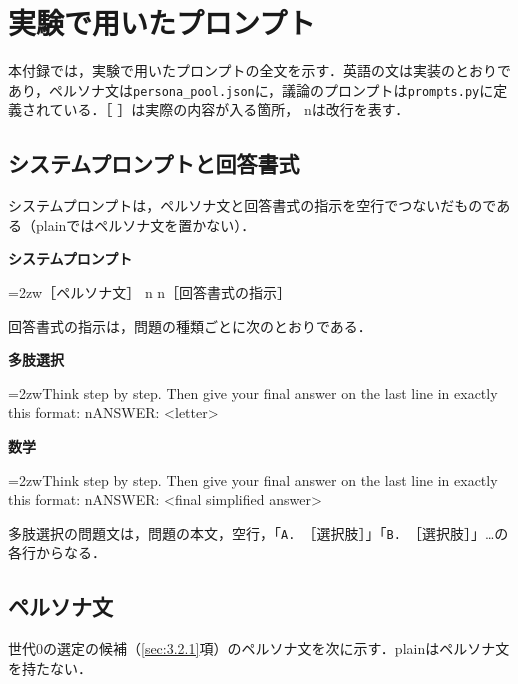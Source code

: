

\chapter{実験で用いたプロンプト}
\label{app:prompts}

\newcommand{\nl}{{\ttfamily\char92 n}}
\newcommand{\prompt}[2]{\par\noindent\textbf{#1}\par
  {\small\ttfamily\raggedright\leftskip=2zw\noindent #2\par}\smallskip}

本付録では，実験で用いたプロンプトの全文を示す．英語の文は実装のとおりであり，ペルソナ文は\texttt{persona\_pool.json}に，議論のプロンプトは\texttt{prompts.py}に定義されている．［ ］は実際の内容が入る箇所，\nl は改行を表す．

\section{システムプロンプトと回答書式}
\label{app:A.1}

システムプロンプトは，ペルソナ文と回答書式の指示を空行でつないだものである（plainではペルソナ文を置かない）．
\prompt{システムプロンプト}{［ペルソナ文］\nl\nl［回答書式の指示］}

回答書式の指示は，問題の種類ごとに次のとおりである．
\prompt{多肢選択}{Think step by step. Then give your final answer on the last line in exactly this format:\nl ANSWER: <letter>}
\prompt{数学}{Think step by step. Then give your final answer on the last line in exactly this format:\nl ANSWER: <final simplified answer>}

多肢選択の問題文は，問題の本文，空行，「\texttt{A. }［選択肢］」「\texttt{B. }［選択肢］」…の各行からなる．

\section{ペルソナ文}
\label{app:A.2}

世代0の選定の候補（\ref{sec:3.2.1}項）のペルソナ文を次に示す．plainはペルソナ文を持たない．

